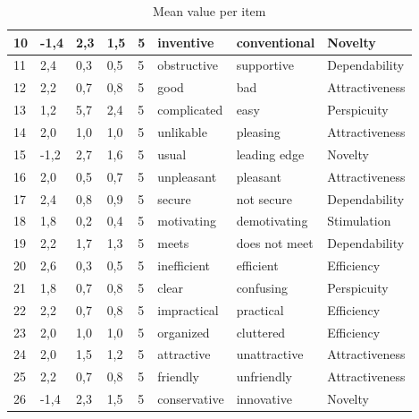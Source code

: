 \documentclass[conference,onecolumn]{IEEEtran}
\begin{document}
\begin{table}[H]
\begin{center}
\begin{tabular}[H]{ |m{1cm}|m{1cm}|m{1.2cm}|m{1.2cm}|m{1cm}|m{2cm}|m{3cm}|m{2cm}|}
                10	&-1,4	&2,3	&1,5	&5	&inventive	            &conventional	            &Novelty        \\ \hline
                11	&2,4	&0,3	&0,5	&5	&obstructive	        &supportive	                &Dependability      \\ \hline
                12	&2,2	&0,7	&0,8	&5	&good	                &bad	                    &Attractiveness     \\ \hline
                13	&1,2	&5,7	&2,4	&5	&complicated	        &easy	                    &Perspicuity        \\ \hline
                14	&2,0	&1,0	&1,0	&5	&unlikable	            &pleasing	                &Attractiveness     \\ \hline
                15	&-1,2	&2,7	&1,6	&5	&usual	                &leading edge	            &Novelty        \\ \hline
                16	&2,0	&0,5	&0,7	&5	&unpleasant	            &pleasant	                &Attractiveness     \\ \hline
                17	&2,4	&0,8	&0,9	&5	&secure	                &not secure	                &Dependability      \\ \hline
                18	&1,8	&0,2	&0,4	&5	&motivating	            &demotivating	            &Stimulation        \\ \hline
                19	&2,2	&1,7	&1,3	&5	&meets			        &does not meet				&Dependability      \\ \hline
                20	&2,6	&0,3	&0,5	&5	&inefficient	        &efficient	                &Efficiency     \\ \hline
                21	&1,8	&0,7	&0,8	&5	&clear	                &confusing	                &Perspicuity        \\ \hline
                22	&2,2	&0,7	&0,8	&5	&impractical	        &practical	                &Efficiency     \\ \hline
                23	&2,0	&1,0	&1,0	&5	&organized	            &cluttered	                &Efficiency     \\ \hline
                24	&2,0	&1,5	&1,2	&5	&attractive	            &unattractive	            &Attractiveness     \\ \hline
                25	&2,2	&0,7	&0,8	&5	&friendly	            &unfriendly	                &Attractiveness     \\ \hline
                26	&-1,4	&2,3	&1,5	&5	&conservative	        &innovative	                &Novelty        \\ 
                \hline
            \end{tabular}
        \end{center}
        \caption{Mean value per item}
        \label{table:Mean value per item}
    \end{table}


\newpage


\end{document}

